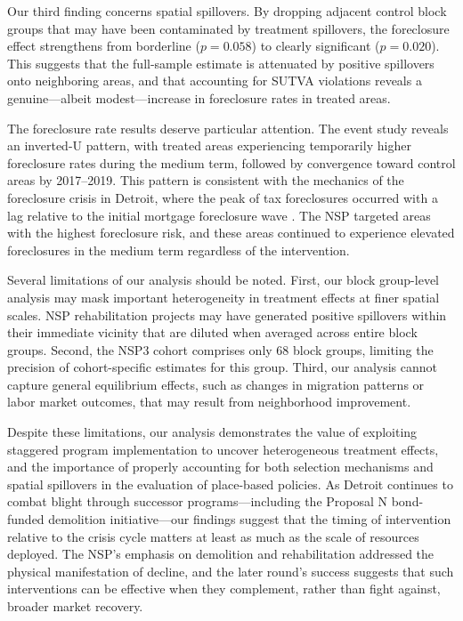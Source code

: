 \documentclass[12pt,authoryear]{elsarticle}
\begin{document}
Our third finding concerns spatial spillovers. By dropping adjacent control block groups that may have been contaminated by treatment spillovers, the foreclosure effect strengthens from borderline ($p = 0.058$) to clearly significant ($p = 0.020$). This suggests that the full-sample estimate is attenuated by positive spillovers onto neighboring areas, and that accounting for SUTVA violations reveals a genuine---albeit modest---increase in foreclosure rates in treated areas.

The foreclosure rate results deserve particular attention. The event study reveals an inverted-U pattern, with treated areas experiencing temporarily higher foreclosure rates during the medium term, followed by convergence toward control areas by 2017--2019. This pattern is consistent with the mechanics of the foreclosure crisis in Detroit, where the peak of tax foreclosures occurred with a lag relative to the initial mortgage foreclosure wave \citep{alm2014}. The NSP targeted areas with the highest foreclosure risk, and these areas continued to experience elevated foreclosures in the medium term regardless of the intervention.

Several limitations of our analysis should be noted. First, our block group-level analysis may mask important heterogeneity in treatment effects at finer spatial scales. NSP rehabilitation projects may have generated positive spillovers within their immediate vicinity that are diluted when averaged across entire block groups. Second, the NSP3 cohort comprises only 68 block groups, limiting the precision of cohort-specific estimates for this group. Third, our analysis cannot capture general equilibrium effects, such as changes in migration patterns or labor market outcomes, that may result from neighborhood improvement.

Despite these limitations, our analysis demonstrates the value of exploiting staggered program implementation to uncover heterogeneous treatment effects, and the importance of properly accounting for both selection mechanisms and spatial spillovers in the evaluation of place-based policies. As Detroit continues to combat blight through successor programs---including the Proposal N bond-funded demolition initiative---our findings suggest that the timing of intervention relative to the crisis cycle matters at least as much as the scale of resources deployed. The NSP's emphasis on demolition and rehabilitation addressed the physical manifestation of decline, and the later round's success suggests that such interventions can be effective when they complement, rather than fight against, broader market recovery.
\end{document}
